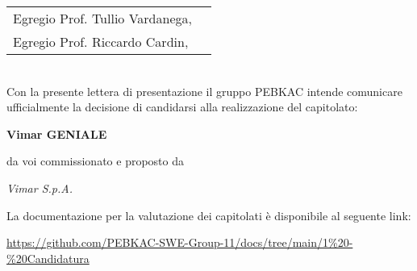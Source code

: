 \documentclass[12pt, a4paper]{article}
\begin{document}

\begin{tabular}{@{}l l@{}}
  Egregio Prof. Tullio Vardanega, &  \\Egregio Prof. Riccardo Cardin,
\end{tabular}
\\

Con la presente lettera di presentazione il gruppo PEBKAC intende comunicare ufficialmente la decisione di candidarsi alla realizzazione del capitolato:

{\huge\begin{center}\textbf{Vimar GENIALE}\end{center}}

da voi commissionato e proposto da 
{\begin{center}\textit{Vimar S.p.A.}\end{center}}
La documentazione per la valutazione dei capitolati è disponibile al seguente link:

\begin{center}
\href{https://github.com/PEBKAC-SWE-Group-11/docs/tree/main/1%20-%20Candidatura}{https://github.com/PEBKAC-SWE-Group-11/docs/tree/main/1\%20-\%20Candidatura}
\end{center}
\end{document}
